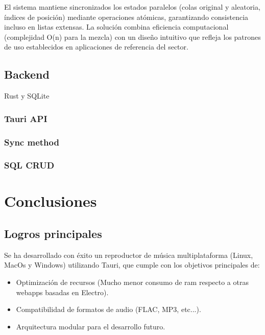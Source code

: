 \documentclass[11pt, a4paper]{article}
\begin{document}
                El sistema mantiene sincronizados los estados paralelos (colas original y aleatoria, índices de posición) mediante operaciones atómicas, garantizando consistencia incluso en listas extensas. La solución combina eficiencia computacional (complejidad O(n) para la mezcla) con un diseño intuitivo que refleja los patrones de uso establecidos en aplicaciones de referencia del sector.

        \subsection{Backend}

        Rust y SQLite

            \subsubsection{Tauri API}

            \subsubsection{Sync method}

            \subsubsection{SQL CRUD}


\section{Conclusiones}

        \subsection{Logros principales}

        Se ha desarrollado con éxito un reproductor de música multiplataforma (Linux, MacOs y Windows) utilizando Tauri, que cumple con los objetivos principales de:

        \begin{itemize}
            \item Optimización de recursos (Mucho menor consumo de ram respecto a otras webapps basadas en Electro).
            \item Compatibilidad de formatos de audio (FLAC, MP3, etc...).
            \item Arquitectura modular para el desarrollo futuro.
        \end{itemize}
\end{document}
